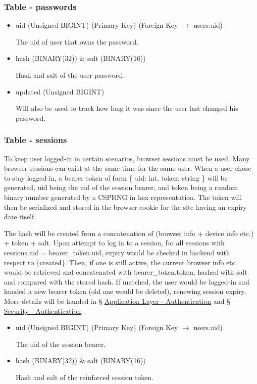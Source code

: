 \documentclass[12pt]{report}
\newcommand{\n}{\par}
\begin{document}
\subsubsection{Table - passwords} \label{data-layer.design.user-system.passwords}
\begin{itemize}
	\item uid (Unsigned BIGINT) (Primary Key) (Foreign Key $\rightarrow$ users.uid)\n
	      The uid of user that owns the password.
	\item hash (BINARY(32)) \& salt (BINARY(16))\n
	      Hash and salt of the user password.
	\item updated (Unsigned BIGINT)\n
	      Will also be used to track how long it was since the user last changed his password.
\end{itemize}

\subsubsection{Table - sessions} \label{data-layer.design.user-system.sessions}
To keep user logged-in in certain scenarios, browser sessions must be used.
Many browser sessions can exist at the same time for the same user.
When a user chose to stay logged-in, a bearer token of form
\{ uid: int, token: string \}
will be generated,
uid being the uid of the session bearer, and
token being a random binary number generated by a CSPRNG in hex representation.
The token will then be serialized and stored in the browser cookie for the site having an expiry date itself.\n
The hash will be created from a concatenation of (browser info + device info etc.) + token + salt.
Upon attempt to log in to a session,
for all sessions with sessions.uid = bearer\_token.uid,
expiry would be checked in backend with respect to \{created\}.
Then, if one is still active, the current browser info etc. would be retrieved and concatenated with bearer\_token.token,
hashed with salt and compared with the stored hash.
If matched, the user would be logged-in and handed a new bearer token (old one would be deleted), renewing session expiry.
More details will be handed in \S{} \hyperref[application-layer.implementation.authentication]{Application Layer - Authentication} and
\S{} \hyperref[security.authentication]{Security - Authentication}.
\begin{itemize}
	\item uid (Unsigned BIGINT) (Primary Key) (Foreign Key $\rightarrow$ users.uid)\n
	      The uid of the session bearer.
	\item hash (BINARY(32)) \& salt (BINARY(16))\n
	      Hash and salt of the reinforced session token.
\end{itemize}
\end{document}
